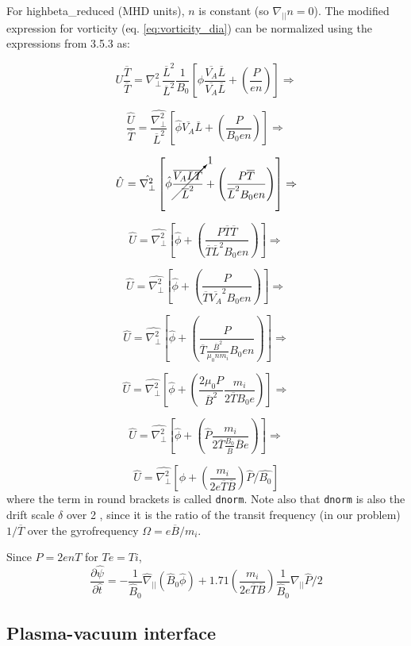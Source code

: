 \documentclass[12pt, a4paper]{article}
\newcommand{\code}[1]{\texttt{#1}}
\newcommand{\deriv}[2]{\ensuremath{\frac{\partial #1}{\partial #2}}}
\newcommand{\Bbar}{\overline{B}}
\newcommand{\Lbar}{\overline{L}}
\newcommand{\Tbar}{\overline{T}}
\newcommand{\delp}{\nabla_\perp^2}
\begin{document}
For highbeta\_reduced (MHD units), $n$ is constant (so $\nabla_{||} n = 0$). The modified expression
for vorticity (eq. \ref{eq:vorticity_dia}) can be normalized using the expressions from 3.5.3 as:

\[
U \frac{\Tbar}{\Tbar} = \delp \frac{\Lbar^2}{\Lbar^2} \frac{1}{B_0} \left[\phi\frac{\overline{V_A }\Lbar}{\overline{V_A} \Lbar} + \left(\frac{P}{e n}\right) \right] \Rightarrow
\]

\[
\frac{\hat{U}}{\Tbar} =  \frac{\hat{\delp}}{\Lbar^2} \left[\hat{\phi} \overline{V_A} \Lbar + \left(\frac{P}{B_0 e n}\right) \right] \Rightarrow
\]

\[
\hat{U}=  \hat{\delp} \left[\hat{\phi} \cancelto{1}{\frac{\overline{V_A} \Lbar\Tbar}{\Lbar^2} }+ \left(\frac{P\Tbar}{\Lbar^2 B_0 e n}\right) \right] \Rightarrow
\]

\[
\hat{U}=  \hat{\delp} \left[\hat{\phi} + \left(\frac{P\Tbar\Tbar}{\Tbar\Lbar^2 B_0 e n}\right) \right] \Rightarrow
\]

\[
\hat{U}=  \hat{\delp} \left[\hat{\phi} + \left(\frac{P}{\Tbar\overline{V_A}^2 B_0 e n}\right) \right] \Rightarrow
\]

\[
\hat{U}=  \hat{\delp} \left[\hat{\phi} + \left(\frac{P}{\Tbar \frac{ \Bbar^2} { \mu_0 n m_i} B_0 e n}\right) \right] \Rightarrow
\]

\[
\hat{U}=  \hat{\delp} \left[\hat{\phi} + \left(\frac{2  \mu_0 P}{\Bbar^2} \frac{m_i}{2 \Tbar B_0 e }\right) \right] \Rightarrow
\]

\[
\hat{U}=  \hat{\delp} \left[\hat{\phi} + \left(\hat{P} \frac{m_i}{2 \Tbar \frac{B_0}{\Bbar} \Bbar e }\right) \right] \Rightarrow
\]

\[
\hat{U} = \hat{\delp}\left[\hat{\phi} + \left(\frac{m_i}{2e\Tbar \Bbar}\right) \hat{P} / \hat{B_0}\right]
\]
where the term in round brackets is called \code{dnorm}. Note also that \code{dnorm} is also the drift scale $\delta$ over 2 , since it is the ratio of the transit frequency (in our problem) $1 / \Tbar $ over the gyrofrequency $\Omega= e \Bbar / m_i $.




Since $P = 2enT$ for $Te = Ti$, 
\[
\deriv{\hat{\psi}}{\hat{t}} = -\frac{1}{\hat{B}_0}\hat{\nabla}_{||}\left(\hat{B}_0\hat{\phi}\right) + 1.71\left(\frac{m_i}{2e\Tbar \Bbar}\right)\frac{1}{\hat{B}_0}\nabla_{||}\hat{P}/2
\]

\subsection{Plasma-vacuum interface}
\end{document}

